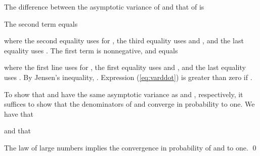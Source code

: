 \documentclass[letterpaper]{article} \usepackage{aaai19}  \usepackage{times}  \usepackage{helvet}  \usepackage{courier}  \usepackage{url}  \usepackage{graphicx}  \frenchspacing  \usepackage{comment}
\begin{document}
The difference between the asymptotic variance of  and that of  is

The second term equals

where the second equality uses  for , the third equality uses  and , and the last equality uses .
The first term is nonnegative, and equals

where the first line uses  for , the first equality uses  and , and the last equality uses .
By Jensen's inequality, .
Expression (\ref{eq:varddot}) is greater than zero if .

To show that  and  have the same asymptotic variance as  and , respectively, it suffices to show that the denominators of  and  converge in probability to one.
We have that

and that

The law of large numbers implies the convergence in probability of  and  to one.
\qed
\end{document}

